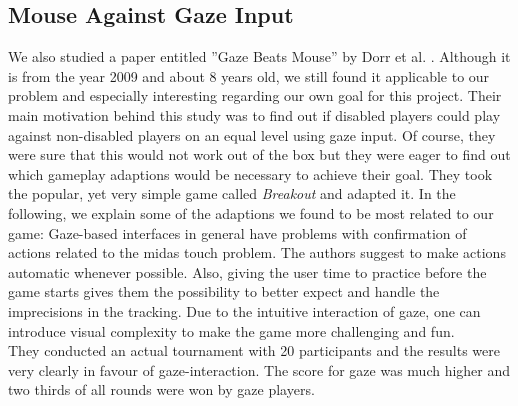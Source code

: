 \documentclass{sigchi}
\begin{document}
\subsection{Mouse Against Gaze Input}
We also studied a paper entitled ''Gaze Beats Mouse'' by Dorr et al. \cite{dorr2009gaze}. Although it is from the year 2009 and about 8 years old, we still found it applicable to our problem and especially interesting regarding our own goal for this project. Their main motivation behind this study was to find out if disabled players could play against non-disabled players on an equal level using gaze input. Of course, they were sure that this would not work out of the box but they were eager to find out which gameplay adaptions would be necessary to achieve their goal. They took the popular, yet very simple game called \textit{Breakout} and adapted it. In the following, we explain some of the adaptions we found to be most related to our game: Gaze-based interfaces in general have problems with confirmation of actions related to the midas touch problem. The authors suggest to make actions automatic whenever possible. Also, giving the user time to practice before the game starts gives them the possibility to better expect and handle the imprecisions in the tracking. Due to the intuitive interaction of gaze, one can introduce visual complexity to make the game more challenging and fun.\\
They conducted an actual tournament with 20 participants and the results were very clearly in favour of gaze-interaction. The score for gaze was much higher and two thirds of all rounds were won by gaze players.
\end{document}
